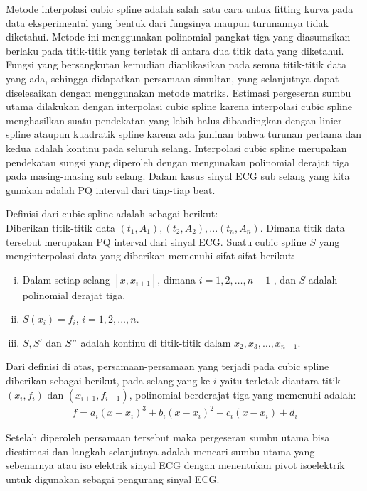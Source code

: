 
Metode interpolasi cubic spline adalah salah satu cara untuk fitting kurva pada
data eksperimental yang bentuk dari fungsinya maupun turunannya tidak diketahui.
Metode ini menggunakan polinomial pangkat tiga yang diasumsikan berlaku pada
titik-titik yang terletak di antara dua titik data yang diketahui. Fungsi yang
bersangkutan kemudian diaplikasikan pada semua titik-titik data yang ada,
sehingga didapatkan persamaan simultan, yang selanjutnya dapat diselesaikan
dengan menggunakan metode matriks. Estimasi pergeseran sumbu utama dilakukan
dengan interpolasi cubic spline karena interpolasi cubic spline menghasilkan
suatu pendekatan yang lebih halus dibandingkan dengan linier spline ataupun
kuadratik spline karena ada jaminan bahwa turunan pertama dan kedua adalah
kontinu pada seluruh selang. Interpolasi cubic spline merupakan pendekatan
sungsi yang diperoleh dengan mengunakan polinomial derajat tiga pada
masing-masing sub selang. Dalam kasus sinyal ECG sub selang yang kita gunakan
adalah PQ interval dari tiap-tiap beat.
 
\noindent Definisi dari cubic spline adalah sebagai berikut: \\
Diberikan titik-titik data $(t_1, A_1), (t_2, A_2),...(t_n, A_n)$. Dimana
titik data tersebut merupakan PQ interval dari sinyal ECG. Suatu cubic spline
$S$ yang menginterpolasi data yang diberikan memenuhi sifat-sifat berikut: 
\begin{enumerate}[(i)] 
  \item Dalam setiap selang $[x, x_{i+1}]$, dimana $i=1, 2, \dots, n-1$ , dan
  $S$ adalah polinomial derajat tiga. 
  \item $S(x_i)=f_i$, $i=1,2,...,n.$ 
  \item $S, S'$ dan $S"$ adalah kontinu di titik-titik dalam $x_2, x_3, \dots,
  x_{n-1}$.
\end{enumerate}
 
Dari definisi di atas, persamaan-persamaan yang terjadi pada cubic spline
diberikan sebagai berikut, pada selang yang ke-$i$ yaitu terletak diantara titik
$(x_i, f_i)$ dan $(x_{i+1}, f_{i+1})$, polinomial berderajat tiga yang memenuhi
adalah: 
\begin{align}
	\label{eq:polybwr}
	f = a_i(x-x_i)^3 + b_i(x-x_i)^2 + c_i(x-x_i) + d_i
\end{align}

Setelah diperoleh persamaan tersebut maka pergeseran sumbu utama bisa diestimasi
dan langkah selanjutnya adalah mencari sumbu utama yang sebenarnya atau iso
elektrik sinyal ECG dengan menentukan pivot isoelektrik untuk digunakan sebagai
pengurang sinyal ECG. 

